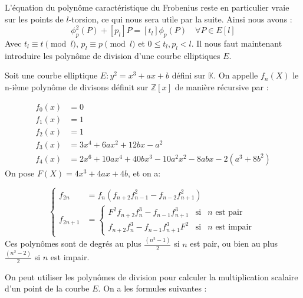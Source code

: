 \documentclass{article}
\begin{document}
L'équation du polynôme caractéristique du Frobenius reste en particulier vraie sur les points de $l$-torsion, ce qui nous sera utile par la suite. Ainsi nous avons : 
\begin{equation}
\label{eqnfrobenius}
 \phi_p^2(P)  + [p_l]P = [t_{l}] \phi_p(P) \quad \forall P \in E[l]
\end{equation} 
Avec $t_l \equiv t \pmod l$, $p_l \equiv p \pmod l$ et $0 \leq t_l, p_l < l$. 
\newline
Il nous faut maintenant introduire les polynôme de division d'une courbe elliptiques $E$.

\begin{defi}
Soit une courbe elliptique $E : y^2 = x^3 + ax+b$ défini sur $\mathbb{K}$. On appelle $f_n(X)$ le n-ième polynôme de divisons définit sur $\mathbb{Z}[x]$ de manière récursive par : 


\begin{align*}
f_0(x) &= 0 \\
f_1(x) &= 1 \\
f_2(x) &= 1 \\
f_3(x) &= 3x^4 + 6ax^2 +12bx - a^2 \\
f_4(x) &= 2x^6 + 10ax^4 +40bx^3 - 10a^2x^2 - 8abx - 2(a^3 + 8b^2)
\end{align*}
On pose $F(X)= 4x^3 + 4ax + 4b$, et on a:

\begin{equation}
\left\lbrace
\begin{array}{ll}
f_{2n}& =  f_n(f_{n+2}f_{n-1}^2 - f_{n-2}f_{n+1}^2)   \\
f_{2n+1}& = \left\lbrace 
\begin{array}{ccc}
F^2f_{n+2}f_n^3 - f_{n-1}f_{n+1}^3 & \mbox{si} & n \text{ est pair}\\
f_{n+2}f_n^3 - f_{n-1}f_{n+1}^3F^2 & \mbox{si} & n \text{ est impair} \end{array}\right.

\end{array} \right.
\end{equation} 
Ces polynômes sont de degrés au plus $\frac{(n^2 -1)}{2}$ si $n$ est pair, ou bien  au plus $\frac{(n^2 -2)}{2}$ si $n$ est impair.
\end{defi}


On peut utiliser les polynômes de division pour calculer la multiplication scalaire d'un point de la courbe $E$.
On a les formules suivantes : 
\end{document}
